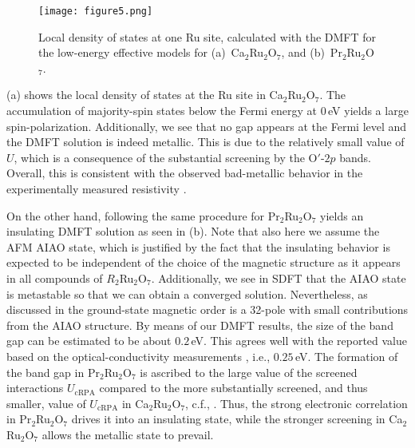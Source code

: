 \documentclass[10pt]{iopart}
\begin{document}
\begin{figure}
  \texttt{[image: figure5.png]}
  \caption{Local density of states at one Ru site, calculated with the DMFT for the low-energy effective models for (a)~Ca$_2$Ru$_2$O$_7$, and (b)~Pr$_2$Ru$_2$O$_7$.}
  \label{fig:5}
\end{figure}

 (a) shows the local density of states at the Ru site in Ca$_2$Ru$_2$O$_7$. The accumulation of majority-spin states below the Fermi energy at $0\,$eV yields a large spin-polarization. Additionally, we see that no gap appears at the Fermi level and the DMFT solution is indeed metallic. This is due to the relatively small value of $U$, which is a consequence of the substantial screening by the O$'$-$2p$ bands. Overall, this is consistent with the observed bad-metallic behavior in the experimentally measured resistivity \cite{kaneko2021fully}.

On the other hand, following the same procedure for Pr$_2$Ru$_2$O$_7$ yields an insulating DMFT solution as seen in  (b). Note that also here we assume the AFM AIAO state, which is justified by the fact that the insulating behavior is expected to be independent of the choice of the magnetic structure as it appears in all compounds of $R_2$Ru$_2$O$_7$. Additionally, we see in SDFT that the AIAO state is metastable so that we can obtain a converged solution. Nevertheless, as discussed in  the ground-state magnetic order is a 32-pole with small contributions from the AIAO structure. By means of our DMFT results, the size of the band gap can be estimated to be about $0.2\,$eV. This agrees well with the reported value based on the optical-conductivity measurements \cite{kaneko2020}, i.e., $0.25\,$eV. 
The formation of the band gap in Pr$_2$Ru$_2$O$_7$ is ascribed to the large value of the screened interactions $U_{\mathrm{cRPA}}$ compared to the more substantially screened, and thus smaller, value of $U_{\mathrm{cRPA}}$ in Ca$_2$Ru$_2$O$_7$, c.f., . Thus, the strong electronic correlation in Pr$_2$Ru$_2$O$_7$ drives it into an insulating state, while the stronger screening in Ca$_2$Ru$_2$O$_7$ allows the metallic state to prevail.
\end{document}
